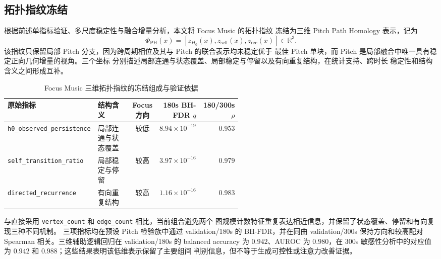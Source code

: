 \documentclass{article}
\begin{document}
\subsection{拓扑指纹冻结}
\label{sec:frozen_topology_fingerprint}

根据前述单指标验证、多尺度稳定性与融合增量分析，本文将 Focus Music 的拓扑指纹
冻结为三维 Pitch Path Homology 表示，记为
\begin{equation}
\Phi_{\mathrm{PH}}(x)=
\left[z_{H_0}(x),z_{\mathrm{self}}(x),z_{\mathrm{rec}}(x)\right]
\in\mathbb R^3.
\label{eq:frozen_pitch3_fingerprint}
\end{equation}
该指纹只保留局部 Pitch 分支，因为跨周期相位及其与 Pitch 的联合表示均未稳定优于
最佳 Pitch 单块，而 Pitch 是局部融合中唯一具有稳定正向几何增量的视角。三个坐标
分别描述局部连通与状态覆盖、局部稳定与停留以及有向重复结构，在统计支持、跨时长
稳定性和结构含义之间形成互补。

\begin{table}[htbp]
\centering
\caption{Focus Music 三维拓扑指纹的冻结组成与验证依据}
\label{tab:frozen_fingerprint}
\setlength{\tabcolsep}{3pt}
\begin{tabular}{p{0.29\linewidth}p{0.25\linewidth}crr}
\toprule
原始指标 & 结构含义 & Focus 方向 & 180s BH-FDR $q$ & 180/300s $\rho$ \\
\midrule
\texttt{h0\_observed\_persistence} & 局部连通与状态覆盖 & 较低 & $8.94\times10^{-19}$ & 0.953 \\
\texttt{self\_transition\_ratio} & 局部稳定与停留 & 较高 & $3.97\times10^{-16}$ & 0.979 \\
\texttt{directed\_recurrence} & 有向重复结构 & 较高 & $1.16\times10^{-16}$ & 0.983 \\
\bottomrule
\end{tabular}
\end{table}

与直接采用 \texttt{vertex\_count} 和 \texttt{edge\_count} 相比，当前组合避免两个
图规模计数特征重复表达相近信息，并保留了状态覆盖、停留和有向复现三种不同机制。
三项指标均在预设 Pitch 检验族中通过 validation/180s 的 BH-FDR，并在同曲
validation/300s 保持方向和较高配对 Spearman 相关。三维辅助逻辑回归在
validation/180s 的 balanced accuracy 为 $0.942$、AUROC 为 $0.980$，在 300s
敏感性分析中的对应值为 $0.942$ 和 $0.988$；这些结果表明该低维表示保留了主要组间
判别信息，但不等于生成可控性或注意力改善证据。
\end{document}
